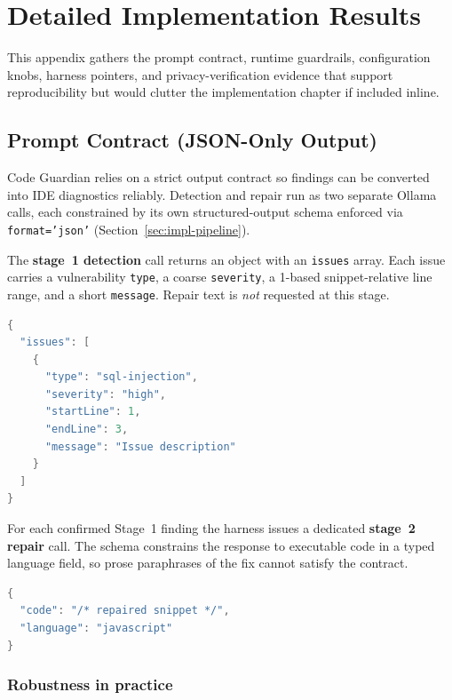 \chapter{Detailed Implementation Results}
\label{appendix:impl-details}
\label{appendix:impl-results}

This appendix gathers the prompt contract, runtime guardrails, configuration knobs, harness pointers, and privacy-verification evidence that support reproducibility but would clutter the implementation chapter if included inline.

\section{Prompt Contract (JSON-Only Output)}
\label{app:prompt-contract}

Code Guardian relies on a strict output contract so findings can be converted into IDE diagnostics reliably. Detection and repair run as two separate Ollama calls, each constrained by its own structured-output schema enforced via \texttt{format='json'} (Section~\ref{sec:impl-pipeline}).

The \textbf{stage~1 detection} call returns an object with an \texttt{issues} array. Each issue carries a vulnerability \texttt{type}, a coarse \texttt{severity}, a 1-based snippet-relative line range, and a short \texttt{message}. Repair text is \emph{not} requested at this stage.

\begin{lstlisting}[language=Java, caption={Stage~1 detection schema (conceptual)}, label={lst:appendix-stage1-schema}]
{
  "issues": [
    {
      "type": "sql-injection",
      "severity": "high",
      "startLine": 1,
      "endLine": 3,
      "message": "Issue description"
    }
  ]
}
\end{lstlisting}

For each confirmed Stage~1 finding the harness issues a dedicated \textbf{stage~2 repair} call. The schema constrains the response to executable code in a typed language field, so prose paraphrases of the fix cannot satisfy the contract.

\begin{lstlisting}[language=Java, caption={Stage~2 repair schema (conceptual)}, label={lst:appendix-stage2-schema}]
{
  "code": "/* repaired snippet */",
  "language": "javascript"
}
\end{lstlisting}

\subsection*{Robustness in practice}

